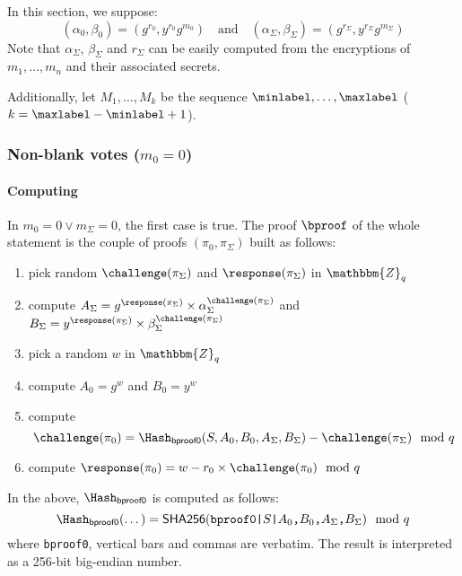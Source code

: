 \documentclass[a4paper]{article}
\newcommand{\Z}{\mathbbm{Z}}
\newcommand{\shatwo}{\textsf{SHA256}}
\begin{document}
In this section, we suppose:
\[
(\alpha_0,\beta_0)=(g^{r_0},y^{r_0}g^{m_0})
\quad\text{and}\quad
(\alpha_\Sigma,\beta_\Sigma)=(g^{r_\Sigma},y^{r_\Sigma}g^{m_\Sigma})
\]
Note that $\alpha_\Sigma$, $\beta_\Sigma$ and $r_\Sigma$ can be easily
computed from the encryptions of $m_1,\dotsc,m_n$ and their associated
secrets.

Additionally, let $M_1,\dotsc,M_k$ be the sequence
$\minlabel,\dots,\maxlabel$ ($k=\maxlabel-\minlabel+1$).

\subsubsection{Non-blank votes ($m_0=0$)}
\label{non-blank-votes}

\paragraph{Computing \bproof}
In $m_0=0\lor m_\Sigma=0$, the first case is true. The proof $\bproof$
of the whole statement is the couple of proofs $(\pi_0,\pi_\Sigma)$
built as follows:
\begin{enumerate}
\item pick random $\challenge(\pi_\Sigma)$ and $\response(\pi_\Sigma)$
  in $\Z_q$
\item compute
  $A_\Sigma=g^{\response(\pi_\Sigma)}\times\alpha_\Sigma^{\challenge(\pi_\Sigma)}$
  and
  $B_\Sigma=y^{\response(\pi_\Sigma)}\times\beta_\Sigma^{\challenge(\pi_\Sigma)}$
\item pick a random $w$ in $\Z_q$
\item compute $A_0=g^w$ and $B_0=y^w$
\item compute \[\challenge(\pi_0)=\Hash_{\mathsf{bproof0}}(S,A_0,B_0,A_\Sigma,B_\Sigma)-\challenge(\pi_\Sigma)\mod q\]
\item compute $\response(\pi_0)=w-r_0\times\challenge(\pi_0)\mod q$
\end{enumerate}
In the above, $\Hash_{\mathsf{bproof0}}$ is computed as follows:
\[\Hash_{\mathsf{bproof0}}(\dotsc)=
\shatwo(\verb=bproof0|=S\verb=|=A_0\verb=,=B_0\verb=,=A_\Sigma\verb=,=B_\Sigma)\mod q\]
where \verb=bproof0=, vertical bars and commas are verbatim.
The result is interpreted as a 256-bit big-endian number.
\end{document}
